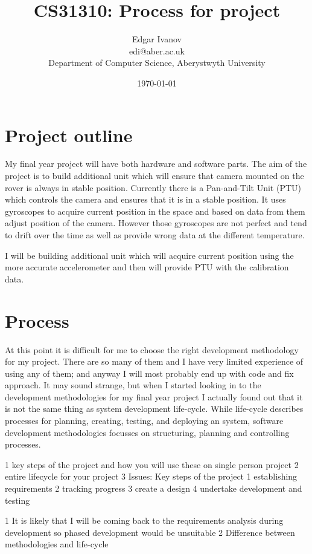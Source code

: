 \documentclass[]{report}
\begin{document}
\title{CS31310: Process for project}
\author{Edgar Ivanov\\ edi@aber.ac.uk \\ Department of Computer Science, Aberystwyth University}
\date{\today}
\maketitle
\section*{Project outline}
My final year project will have both hardware and software parts. The aim of the project is to build additional unit which will ensure that camera mounted on the rover is always in stable position. Currently there is a Pan-and-Tilt Unit (PTU) which controls the camera and ensures that it is in a stable position. It uses gyroscopes to acquire current position in the space and based on data from them adjust position of the camera. However those gyroscopes are not perfect and tend to drift over the time as well as provide wrong data at the different temperature. 

I will be building additional unit which will acquire current position using the more accurate accelerometer and then will provide PTU with the calibration data.

\section*{Process}
At this point it is difficult for me to choose the right development methodology for my project. There are so many of them and I have very limited experience of using any of them; and anyway I will most probably end up with code and fix approach. It may sound strange, but when I started looking in to the development methodologies for my final year project I actually found out that it is not the same thing as system development life-cycle. While life-cycle describes processes for planning, creating, testing, and deploying an system, software development methodologies focusses on structuring, planning and controlling processes.  

1 key steps of the project and how you will use these on single person project
2 entire lifecycle for your project
3 Issues: Key steps of the project
		1 establishing requirements
		2 tracking progress
		3 create a design
		4 undertake development and testing
		
		
		
 1 It is likely that I will be coming back to the requirements analysis during development so phased development would be unsuitable
 2 Difference between methodologies and life-cycle 
 




\end{document}
